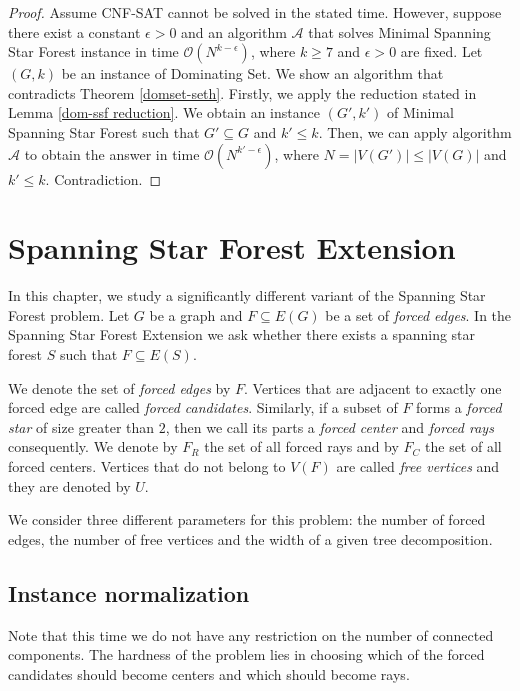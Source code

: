 \documentclass[en]{pracamgr}
\theoremstyle{definition}
\newcommand{\ssf}{spanning star forest}
\newcommand{\ssfp}{{\sc Spanning Star Forest}}
\newcommand{\mssfp}{{\sc Minimal Spanning Star Forest}}
\newcommand{\ssfep}{{\sc Spanning Star Forest Extension}}
\newcommand{\domsetp}{{\sc Dominating Set}}
\newcommand{\cnfsat}{{\sc CNF-SAT}}
\begin{document}
\begin{proof}
	Assume \cnfsat{} cannot be solved in the stated time. However, suppose there exist a constant $\epsilon > 0$ and an algorithm $\mathcal{A}$ that solves \mssfp{} instance in time $\mathcal{O}(N^{k-\epsilon})$, where $k \geq 7$ and $\epsilon > 0$ are fixed. Let $(G,k)$ be an instance of \domsetp{}. We show an algorithm that contradicts Theorem \ref{domset-seth}. Firstly, we apply the reduction stated in Lemma \ref{dom-ssf reduction}. We obtain an instance $(G',k')$ of \mssfp{} such that $G' \subseteq G$ and $k' \leq k$. Then, we can apply algorithm $\mathcal{A}$ to obtain the answer in time $\mathcal{O}(N^{k'-\epsilon})$, where $N=|V(G')| \leq |V(G)|$ and $k'\leq k$. Contradiction.
\end{proof}

\chapter{Spanning Star Forest Extension}\label{sec5}

In this chapter, we study a significantly different variant of the \ssfp{} problem. Let $G$ be a graph and $F \subseteq E(G)$ be a set of \emph{forced edges}. In the \ssfep{} we ask whether there exists a \ssf{} $S$ such that $F \subseteq E(S)$.

We denote the set of \emph{forced edges} by $F$. Vertices that are adjacent to exactly one forced edge are called \emph{forced candidates}. Similarly, if a subset of $F$ forms a \emph{forced star} of size greater than $2$, then we call its parts a \emph{forced center} and \emph{forced rays} consequently. We denote by $F_R$ the set of all forced rays and by $F_C$ the set of all forced centers. Vertices that do not belong to $V(F)$ are called \emph{free vertices} and they are denoted by $U$. 

We consider three different parameters for this problem: the number of forced edges, the number of free vertices and the width of a given tree decomposition. 

\section{Instance normalization} 

Note that this time we do not have any restriction on the number of connected components. The hardness of the problem lies in choosing which of the forced candidates should become centers and which should become rays. 
\end{document}
